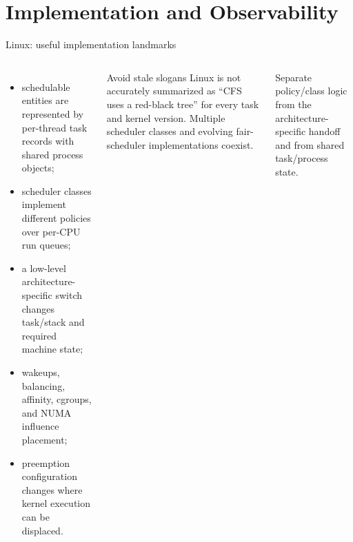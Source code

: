 \documentclass[aspectratio=169,11pt]{beamer}
\begin{document}
\section{Implementation and Observability}

\begin{frame}{Linux: useful implementation landmarks}
  \begin{columns}[T,onlytextwidth]
      \begin{itemize}
        \item schedulable entities are represented by per-thread task records with shared process objects;
        \item scheduler classes implement different policies over per-CPU run queues;
        \item a low-level architecture-specific switch changes task/stack and required machine state;
        \item wakeups, balancing, affinity, cgroups, and NUMA influence placement;
        \item preemption configuration changes where kernel execution can be displaced.
      \end{itemize}
      \begin{alertblock}{Avoid stale slogans}
        Linux is not accurately summarized as ``CFS uses a red-black tree'' for every task and kernel version. Multiple scheduler classes and evolving fair-scheduler implementations coexist.
      \end{alertblock}
      \begin{tcolorbox}[title=Stable lesson]
        Separate policy/class logic from the architecture-specific handoff and from shared task/process state.
      \end{tcolorbox}
  \end{columns}
\end{frame}
\end{document}
